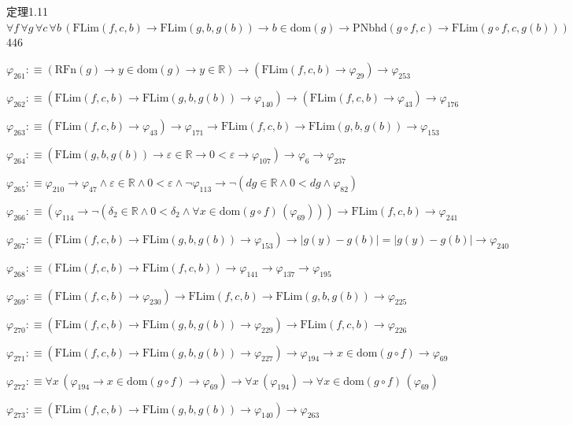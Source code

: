 \begin{fullproof}{定理1.11}{$\forall f\,\forall g\,\forall c\,\forall b\,(\mathrm{FLim}(f,c,b) \to \mathrm{FLim}(g,b,g(b)) \to b \in \mathrm{dom}(g) \to \mathrm{PNbhd}(g \circ f,c) \to \mathrm{FLim}(g \circ f,c,g(b)))$}{446}
\begin{abbrevlist}
\item $\varphi_{261} :\equiv (\mathrm{RFn}(g) \to y \in \mathrm{dom}(g) \to y \in \mathbb{R}) \to (\mathrm{FLim}(f,c,b) \to \varphi_{29}) \to \varphi_{253}$
\item $\varphi_{262} :\equiv (\mathrm{FLim}(f,c,b) \to \mathrm{FLim}(g,b,g(b)) \to \varphi_{140}) \to (\mathrm{FLim}(f,c,b) \to \varphi_{43}) \to \varphi_{176}$
\item $\varphi_{263} :\equiv (\mathrm{FLim}(f,c,b) \to \varphi_{43}) \to \varphi_{171} \to \mathrm{FLim}(f,c,b) \to \mathrm{FLim}(g,b,g(b)) \to \varphi_{153}$
\item $\varphi_{264} :\equiv (\mathrm{FLim}(g,b,g(b)) \to \varepsilon \in \mathbb{R} \to 0 < \varepsilon \to \varphi_{107}) \to \varphi_{6} \to \varphi_{237}$
\item $\varphi_{265} :\equiv \varphi_{210} \to \varphi_{47} \land \varepsilon \in \mathbb{R} \land 0 < \varepsilon \land \neg \varphi_{113} \to \neg (\mathit{dg} \in \mathbb{R} \land 0 < \mathit{dg} \land \varphi_{82})$
\item $\varphi_{266} :\equiv (\varphi_{114} \to \neg (\delta_{2} \in \mathbb{R} \land 0 < \delta_{2} \land \forall x \in \mathrm{dom}(g \circ f)\,(\varphi_{69}))) \to \mathrm{FLim}(f,c,b) \to \varphi_{241}$
\item $\varphi_{267} :\equiv (\mathrm{FLim}(f,c,b) \to \mathrm{FLim}(g,b,g(b)) \to \varphi_{153}) \to \lvert g(y) - g(b) \rvert = \lvert g(y) - g(b) \rvert \to \varphi_{240}$
\item $\varphi_{268} :\equiv (\mathrm{FLim}(f,c,b) \to \mathrm{FLim}(f,c,b)) \to \varphi_{141} \to \varphi_{137} \to \varphi_{195}$
\item $\varphi_{269} :\equiv (\mathrm{FLim}(f,c,b) \to \varphi_{230}) \to \mathrm{FLim}(f,c,b) \to \mathrm{FLim}(g,b,g(b)) \to \varphi_{225}$
\item $\varphi_{270} :\equiv (\mathrm{FLim}(f,c,b) \to \mathrm{FLim}(g,b,g(b)) \to \varphi_{229}) \to \mathrm{FLim}(f,c,b) \to \varphi_{226}$
\item $\varphi_{271} :\equiv (\mathrm{FLim}(f,c,b) \to \mathrm{FLim}(g,b,g(b)) \to \varphi_{227}) \to \varphi_{194} \to x \in \mathrm{dom}(g \circ f) \to \varphi_{69}$
\item $\varphi_{272} :\equiv \forall x\,(\varphi_{194} \to x \in \mathrm{dom}(g \circ f) \to \varphi_{69}) \to \forall x\,(\varphi_{194}) \to \forall x \in \mathrm{dom}(g \circ f)\,(\varphi_{69})$
\item $\varphi_{273} :\equiv (\mathrm{FLim}(f,c,b) \to \mathrm{FLim}(g,b,g(b)) \to \varphi_{140}) \to \varphi_{263}$

\end{abbrevlist}
\end{fullproof}
